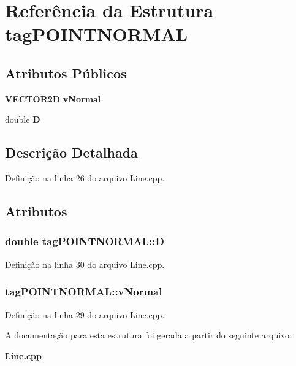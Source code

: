 \section{Referência da Estrutura tag\+P\+O\+I\+N\+T\+N\+O\+R\+M\+AL}
\label{structtag_p_o_i_n_t_n_o_r_m_a_l}
\subsection*{Atributos Públicos}
\begin{DoxyCompactItemize}
\item 
{\bf V\+E\+C\+T\+O\+R2D} {\bf v\+Normal}
\item 
double {\bf D}
\end{DoxyCompactItemize}


\subsection{Descrição Detalhada}


Definição na linha 26 do arquivo Line.\+cpp.



\subsection{Atributos}
\subsubsection[{D}]{\setlength{\rightskip}{0pt plus 5cm}double tag\+P\+O\+I\+N\+T\+N\+O\+R\+M\+A\+L\+::D}\label{structtag_p_o_i_n_t_n_o_r_m_a_l_a7b885fa623f75dcb931d056e6c8e8157}


Definição na linha 30 do arquivo Line.\+cpp.

\subsubsection[{v\+Normal}]{ tag\+P\+O\+I\+N\+T\+N\+O\+R\+M\+A\+L\+::v\+Normal}\label{structtag_p_o_i_n_t_n_o_r_m_a_l_adf3b1c2330c65b75220f6480fa1722d0}


Definição na linha 29 do arquivo Line.\+cpp.



A documentação para esta estrutura foi gerada a partir do seguinte arquivo\+:\begin{DoxyCompactItemize}
\item 
{\bf Line.\+cpp}\end{DoxyCompactItemize}
